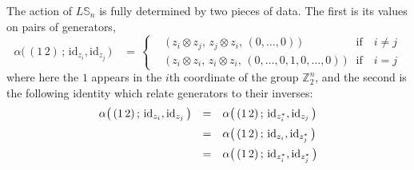 \documentclass{amsbook} %
\newcommand{\id}{\textrm{id}}
\numberwithin{section}{chapter}
\begin{document}
\begin{prop} The action of $L\mathbb{S}_n$ is fully determined by two pieces of data. The first is its values on pairs of generators,
\[ \alpha\big( \, (1 \, 2) \, ; \, \id_{z_i}, \id_{z_j} \, \big) \quad = \, 
		\begin{cases}
			\quad \big( \, z_i \otimes z_j, \, z_j \otimes z_i, \, (0, \ldots, 0) \, \big) & \text{if} \quad i \neq j \\
			\quad \big( \, z_i \otimes z_i, \, z_i \otimes z_i, \, (0,\ldots,0, 1, 0,\ldots,0) \, \big) & \text{if} \quad i = j
		\end{cases} 
\]
where here the $1$ appears in the $i$th coordinate of the group $\mathbb{Z}_2^{n}$, and the second is the following identity which relate generators to their inverses:
\[ \begin{array}{rll} 
			\alpha\big( \, (1 \, 2) \, ; \, \id_{z_i}, \id_{z_j} \, \big) & = & \alpha\big( \, (1 \, 2) \, ; \, \id_{z_i^*}, \id_{z_j} \, \big) \\[\medskipamount]
			& = & \alpha\big( \, (1 \, 2) \, ; \, \id_{z_i}, \id_{z_j^*} \, \big) \\[\medskipamount]
			& = & \alpha\big( \, (1 \, 2) \, ; \, \id_{z_i^*}, \id_{z_j^*} \, \big)
		\end{array}
\]
\end{prop}
\end{document}
